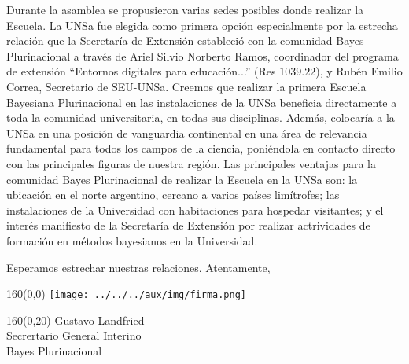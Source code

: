\documentclass[a4paper,10pt]{letter}
\begin{document}
\begin{letter}
\hspace{1cm}
Durante la asamblea se propusieron varias sedes posibles donde realizar la Escuela.
%
La UNSa fue elegida como primera opción especialmente por la estrecha relación que la Secretaría de Extensión estableció con la comunidad Bayes Plurinacional a través de Ariel Silvio Norberto Ramos, coordinador del programa de extensión ``Entornos digitales para educación...'' (Res $1039$.$22$), y Rubén Emilio Correa, Secretario de SEU-UNSa.
%
Creemos que realizar la primera Escuela Bayesiana Plurinacional en las instalaciones de la UNSa beneficia directamente a toda la comunidad universitaria, en todas sus disciplinas.
%
Además, colocaría a la UNSa en una posición de vanguardia continental en una área de relevancia fundamental para todos los campos de la ciencia, poniéndola en contacto directo con las principales figuras de nuestra región.
%
Las principales ventajas para la comunidad Bayes Plurinacional de realizar la Escuela en la UNSa son: la ubicación en el norte argentino, cercano a varios países limítrofes; las instalaciones de la Universidad con habitaciones para hospedar visitantes; y el interés manifiesto de la Secretaría de Extensión por realizar actrividades de formación en métodos bayesianos en la Universidad.


\hspace{1cm}
Esperamos estrechar nuestras relaciones. Atentamente,

\vspace{.3cm}

\begin{textblock}{160}(0,0)
\phantom{.} \hfill \texttt{[image: ../../../aux/img/firma.png]}\hspace{2cm}\phantom{.} \\[0cm]
\end{textblock}
\begin{textblock}{160}(0,20)
 \phantom{.} \hfill Gustavo Landfried \hspace{2.5cm}\phantom{.}\\ \small
\phantom{.} \hfill Secrertario General Interino \hspace{2.5cm}\phantom{.}\\
\phantom{.} \hfill Bayes Plurinacional \hspace{2.5cm}\phantom{.}\\
\end{textblock}

%
%



\end{letter}
\end{document}

